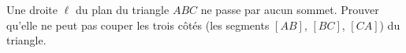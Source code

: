 Une droite $\ell$ du plan du triangle $ABC$ ne passe par aucun sommet.
Prouver qu'elle ne peut pas couper les trois côtés (les segments $[AB]$,
$[BC]$, $[CA]$) du triangle.
